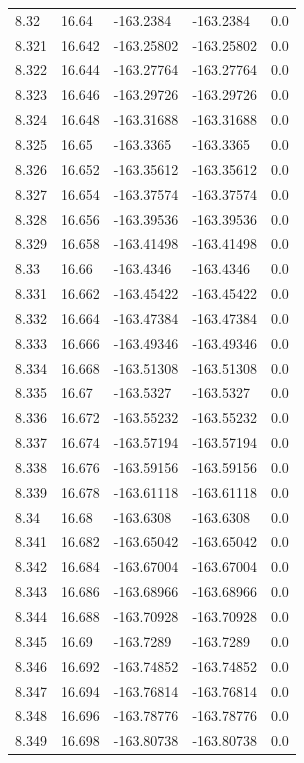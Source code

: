 \begin{tabular}{lllll}
8.32 & 16.64 & -163.2384 & -163.2384 & 0.0 \\
8.321 & 16.642 & -163.25802 & -163.25802 & 0.0 \\
8.322 & 16.644 & -163.27764 & -163.27764 & 0.0 \\
8.323 & 16.646 & -163.29726 & -163.29726 & 0.0 \\
8.324 & 16.648 & -163.31688 & -163.31688 & 0.0 \\
8.325 & 16.65 & -163.3365 & -163.3365 & 0.0 \\
8.326 & 16.652 & -163.35612 & -163.35612 & 0.0 \\
8.327 & 16.654 & -163.37574 & -163.37574 & 0.0 \\
8.328 & 16.656 & -163.39536 & -163.39536 & 0.0 \\
8.329 & 16.658 & -163.41498 & -163.41498 & 0.0 \\
8.33 & 16.66 & -163.4346 & -163.4346 & 0.0 \\
8.331 & 16.662 & -163.45422 & -163.45422 & 0.0 \\
8.332 & 16.664 & -163.47384 & -163.47384 & 0.0 \\
8.333 & 16.666 & -163.49346 & -163.49346 & 0.0 \\
8.334 & 16.668 & -163.51308 & -163.51308 & 0.0 \\
8.335 & 16.67 & -163.5327 & -163.5327 & 0.0 \\
8.336 & 16.672 & -163.55232 & -163.55232 & 0.0 \\
8.337 & 16.674 & -163.57194 & -163.57194 & 0.0 \\
8.338 & 16.676 & -163.59156 & -163.59156 & 0.0 \\
8.339 & 16.678 & -163.61118 & -163.61118 & 0.0 \\
8.34 & 16.68 & -163.6308 & -163.6308 & 0.0 \\
8.341 & 16.682 & -163.65042 & -163.65042 & 0.0 \\
8.342 & 16.684 & -163.67004 & -163.67004 & 0.0 \\
8.343 & 16.686 & -163.68966 & -163.68966 & 0.0 \\
8.344 & 16.688 & -163.70928 & -163.70928 & 0.0 \\
8.345 & 16.69 & -163.7289 & -163.7289 & 0.0 \\
8.346 & 16.692 & -163.74852 & -163.74852 & 0.0 \\
8.347 & 16.694 & -163.76814 & -163.76814 & 0.0 \\
8.348 & 16.696 & -163.78776 & -163.78776 & 0.0 \\
8.349 & 16.698 & -163.80738 & -163.80738 & 0.0 \\

\end{tabular}
